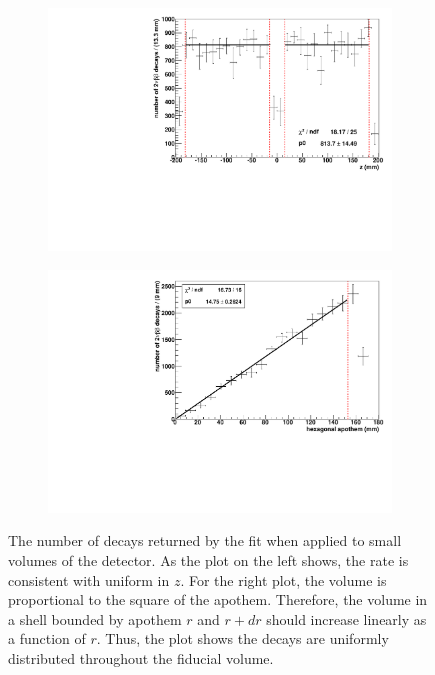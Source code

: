 \documentclass[herrin-thesis.tex]{subfiles}
\begin{document}
\begin{figure}[htb]
	\begin{subfigure}[c]{0.48\textwidth}
	\centering
	\includegraphics[width=\textwidth]{./plots/analysis_bb2n_rate_v_z.pdf}
	\end{subfigure}\hfill%
	\begin{subfigure}[c]{0.48\textwidth}
	\centering
	\includegraphics[width=\textwidth]{./plots/analysis_bb2n_rate_v_apothem.pdf}
	\end{subfigure}
\caption[Number of \twonu decays v. position]{The number of \twonu{} decays returned by the fit when applied to small volumes of the detector. As the plot on the left shows, the rate is consistent with uniform in \(z\). For the right plot, the volume is proportional to the square of the apothem. Therefore, the volume in a shell bounded by apothem \(r\) and \(r+dr\) should increase linearly as a function of \(r\). Thus, the plot shows the \twonu{} decays are uniformly distributed throughout the fiducial volume.}
\label{fig:analysis_bb2n_rate_v_pos}
\end{figure}
\end{document}
